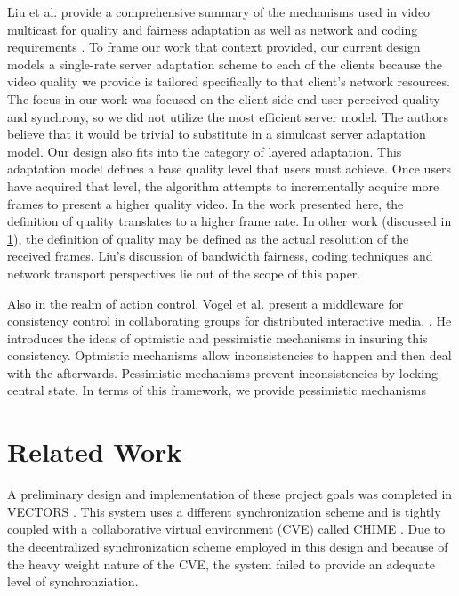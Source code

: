 \documentclass{sig-alternate}
\begin{document}
Liu et al. provide a comprehensive summary of the mechanisms used in
video multicast for quality and fairness adaptation as well as network
and coding requirements \cite{LIU}.  To frame our work that context
provided, our current design models a single-rate server adaptation
scheme to each of the clients because the video quality we provide is
tailored specifically to that client's network resources.  The focus
in our work was focused on the client side end user perceived quality
and synchrony, so we did not utilize the most efficient server model.
The authors believe that it would be trivial to substitute in a
simulcast server adaptation model.  Our design also fits into the
category of layered adaptation.  This adaptation model defines a base
quality level that users must achieve.  Once users have acquired that
level, the algorithm attempts to incrementally acquire more frames to
present a higher quality video.  In the work presented here, the
definition of quality translates to a higher frame rate.  In other
work (discussed in \ref{related}), the definition of quality may be
defined as the actual resolution of the received frames.  Liu's
discussion of bandwidth fairness, coding techniques and network
transport perspectives lie out of the scope of this paper.

Also in the realm of action control, Vogel et al. present a middleware
for consistency control in collaborating groups for distributed
interactive media.  \cite{VOGEL}.  He introduces the ideas of
optmistic and pessimistic mechanisms in insuring this consistency.
Optmistic mechanisms allow inconsistencies to happen and then deal
with the afterwards.  Pessimistic mechanisms prevent inconsistencies
by locking central state.  In terms of this framework, we provide
pessimistic mechanisms

\section{Related Work} \label{related}

A preliminary design and implementation of these project goals was
completed in VECTORS \cite{VECTORS}.  This system uses a different
synchronization scheme and is tightly coupled with a collaborative
virtual environment (CVE) called CHIME \cite{CHIME}.  Due to the
decentralized synchronization scheme employed in this design and
because of the heavy weight nature of the CVE, the system failed to
provide an adequate level of synchronziation.
\end{document}
